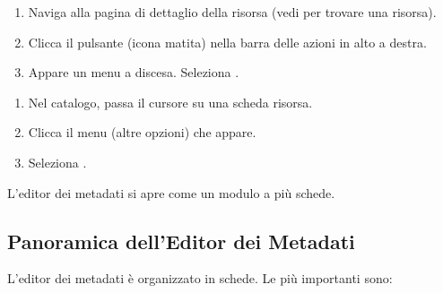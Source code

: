 \documentclass[letterpaper,10pt,english]{sphinxmanual}
\begin{document}
\sphinxAtStartPar
{}
\begin{enumerate}
%
\item {} 
\sphinxAtStartPar
Naviga alla pagina di dettaglio della risorsa (vedi {\hyperref[\detokenize{it/02_trovare_visualizzare:find-it}]{}} per trovare
una risorsa).

\item {} 
\sphinxAtStartPar
Clicca il pulsante  (icona matita) nella barra delle azioni in alto a destra.

\item {} 
\sphinxAtStartPar
Appare un menu a discesa. Seleziona .

\end{enumerate}

\sphinxAtStartPar
{}
\begin{enumerate}
%
\item {} 
\sphinxAtStartPar
Nel catalogo, passa il cursore su una scheda risorsa.

\item {} 
\sphinxAtStartPar
Clicca il menu  (altre opzioni) che appare.

\item {} 
\sphinxAtStartPar
Seleziona .

\end{enumerate}

\sphinxAtStartPar
L’editor dei metadati si apre come un modulo a più schede.


\subsection{Panoramica dell’Editor dei Metadati}
\label{\detokenize{it/03_gestire_metadati:panoramica-dell-editor-dei-metadati}}
\sphinxAtStartPar
L’editor dei metadati è organizzato in schede. Le più importanti sono:
\end{document}
